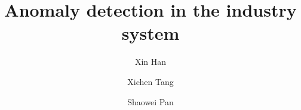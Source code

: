 \documentclass{amsart}
\begin{document}
%
%
\title[A Short Running Title]{Anomaly detection in the industry system}%

\author{Xin Han}
\address[A.~1]{School of Computer Science\\
Xi'an Shiyou University, Shaanxi 710065, China}%

\author{Xichen Tang}
\address[A.~2]{School of Information and Control Engineering \\
Qingdao University of Technology, Qingdao 266033, China}%


\author{Shaowei Pan}
\address[A.~3]{School of Computer Science \\
Xi'an Shiyou University, Shaanxi 710065, China}%

%
%
\date{\gitAuthorDate}%


\maketitle







\end{document}
